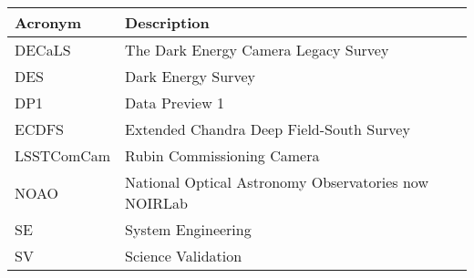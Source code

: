\addtocounter{table}{-1}
\begin{longtable}{p{}p{}}\hline
\textbf{Acronym} & \textbf{Description}  \\\hline

DECaLS & The Dark Energy Camera Legacy Survey \\\hline
DES & Dark Energy Survey \\\hline
DP1 & Data Preview 1 \\\hline
ECDFS & Extended Chandra Deep Field-South Survey \\\hline
LSSTComCam & Rubin Commissioning Camera \\\hline
NOAO & National Optical Astronomy Observatories now NOIRLab \\\hline
SE & System Engineering \\\hline
SV & Science Validation \\\hline
\end{longtable}
